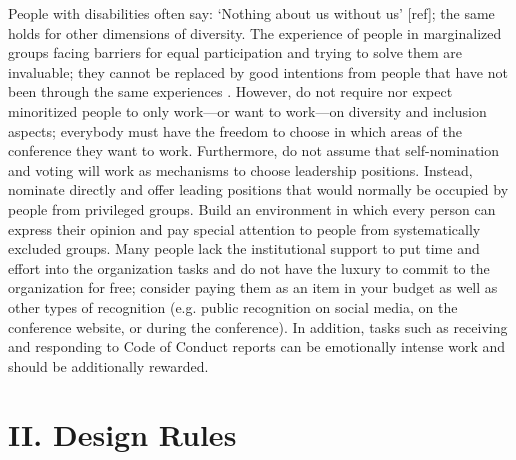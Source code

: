 \documentclass[10pt,letterpaper]{article}
\begin{document}
People with disabilities often say: `Nothing about us without us' [ref]; the same holds for other dimensions of diversity. The experience of people in marginalized groups facing barriers for equal participation and trying to solve them are invaluable; they cannot be replaced by good intentions from people that have not been through the same experiences \cite{costanzachockDesign2020}.
However, do not require nor expect minoritized people to only work—or want to work—on diversity and inclusion aspects; 
everybody must have the freedom to choose in which areas of the conference they want to work. 
Furthermore, do not assume that self-nomination and voting will work as mechanisms to choose leadership positions. Instead, nominate directly and offer leading positions that would normally be occupied by people from privileged groups.
Build an environment in which every person can express their opinion and pay special attention to people from systematically excluded groups.
Many people lack the institutional support to put time and effort into the organization tasks and do not have the luxury to commit to the organization for free; consider paying them as an item in your budget as well as other types of recognition (e.g. public recognition on social media, on the conference website, or during the conference).
In addition, tasks such as receiving and responding to Code of Conduct reports can be emotionally intense work and should be additionally rewarded.



\section*{II. Design Rules}
\end{document}
